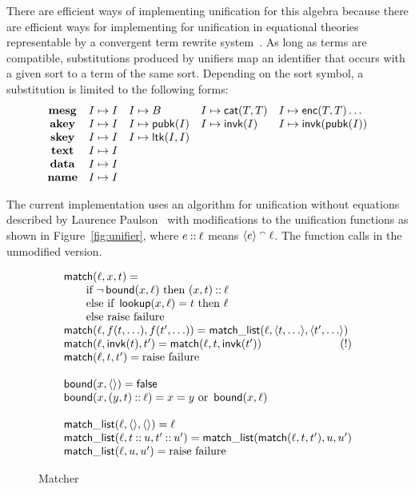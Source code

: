 \documentclass[12pt]{report}
\theoremstyle{definition}
\begin{document}
There are efficient ways of implementing unification for this algebra
because there are efficient ways for implementing for unification in
equational theories representable by a convergent term rewrite
system~\cite{Fay79}. As long as terms are compatible, substitutions
produced by unifiers map an identifier that occurs with a given sort to a
term of the same sort.  Depending on the sort symbol, a substitution is
limited to the following forms:
$$
\begin{array}{cllll}
\operatorname{\mathbf{mesg}}&I\mapsto I&I\mapsto B
&I\mapsto\operatorname{\mathsf{cat}}(T,T)&I\mapsto\operatorname{\mathsf{enc}}(T,T)\ldots\\
\operatorname{\mathbf{akey}}&I\mapsto I&I\mapsto\operatorname{\mathsf{pubk}}(I)
&I\mapsto\operatorname{\mathsf{invk}}(I)&I\mapsto\operatorname{\mathsf{invk}}(\operatorname{\mathsf{pubk}}(I))\\
\operatorname{\mathbf{skey}}&I\mapsto I&I\mapsto\operatorname{\mathsf{ltk}}(I, I)\\
\operatorname{\mathbf{text}}&I\mapsto I\\
\operatorname{\mathbf{data}}&I\mapsto I\\
\operatorname{\mathbf{name}}&I\mapsto I
\end{array}
$$

The current implementation uses an algorithm for unification without
equations described by Laurence Paulson~\cite[Page~381]{Paulson91}
with modifications to the unification functions as shown in
Figure~\ref{fig:unifier}, where $e\mathbin{::}\ell$ means
$\langle e\rangle\mathbin{{}^\smallfrown}\ell$.  The function  calls 
in the unmodified version.

\begin{figure}
$$
\begin{array}{l}
\cn{match}(\ell,x,t) =
\\\qquad\mbox{if }\lnot\cn{bound}(x, \ell)\mbox{ then }(x,t)\cons\ell
\\\qquad\mbox{else if } \cn{lookup}(x,\ell)= t\mbox{ then }\ell
\\\qquad\mbox{else raise failure}
\\\cn{match}(\ell,f(t,\ldots),f(t',\ldots)) =
\cn{match\_list}(\ell,\seq{t,\ldots},\seq{t',\ldots})
\\\cn{match}(\ell,\cn{invk}(t),t') = \cn{match}(\ell,t,\cn{invk}(t'))\hfill(!)
\\\cn{match}(\ell,t,t') =\mbox{raise failure}
\\
\\\cn{bound}(x,\seq{})=\cn{false}
\\\cn{bound}(x,(y,t)\cons\ell)=
x=y\mbox{ or }\cn{bound}(x, \ell)
\\
\\\cn{match\_list}(\ell,\seq{},\seq{}) =\ell
\\\cn{match\_list}(\ell,t\cons u,t'\cons u') =
\cn{match\_list}(\cn{match}(\ell,t,t'), u, u')
\\\cn{match\_list}(\ell,u,u') =\mbox{raise failure}
\end{array}
$$
\caption{Matcher}\label{fig:matcher}
\end{figure}
\end{document}
